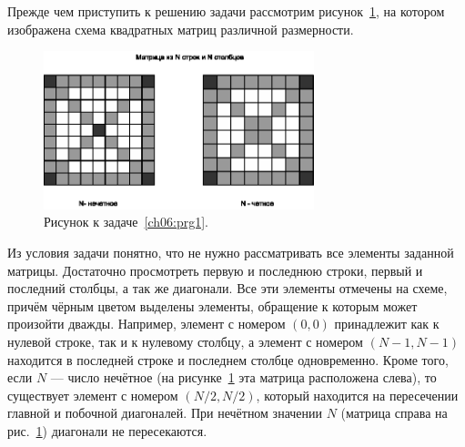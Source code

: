 

Прежде чем приступить к решению задачи рассмотрим рисунок~\ref{ch06:refDrawing8}, на котором изображена схема квадратных
матриц различной размерности. 

\begin{figure}[htb]
\begin{center}
\includegraphics[width=0.7\textwidth]{img/ris_6_9}
\caption{Рисунок к задаче~\ref{ch06:prg1}.}
\label{ch06:refDrawing8}
\end{center}
\end{figure}

Из условия задачи понятно, что не нужно рассматривать все элементы заданной матрицы. Достаточно просмотреть первую и
последнюю строки, первый и последний столбцы, а так же диагонали. Все эти элементы отмечены на схеме, причём чёрным
цветом выделены элементы, обращение к которым может произойти дважды. Например, элемент с номером $(0,0)$ принадлежит как
к нулевой строке, так и к нулевому столбцу, а элемент с номером $(N-1,N-1)$
находится в последней строке и последнем столбце одновременно. Кроме того, если $N$ --- число нечётное 
(на рисунке~\ref{ch06:refDrawing8} эта матрица расположена слева), то существует элемент с номером $(N/2, N/2)$,
который находится на пересечении главной и побочной диагоналей. При нечётном значении $N$ (матрица справа на
рис.~\ref{ch06:refDrawing8}) диагонали не пересекаются.

